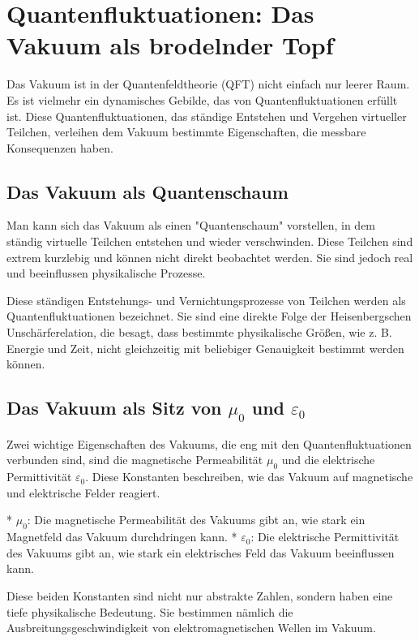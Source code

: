 \documentclass{article}
\begin{document}
\section{Quantenfluktuationen: Das Vakuum als brodelnder Topf}

Das Vakuum ist in der Quantenfeldtheorie (QFT) nicht einfach nur leerer Raum. Es ist vielmehr ein dynamisches Gebilde, das von Quantenfluktuationen erfüllt ist. Diese Quantenfluktuationen, das ständige Entstehen und Vergehen virtueller Teilchen, verleihen dem Vakuum bestimmte Eigenschaften, die messbare Konsequenzen haben.

\subsection{Das Vakuum als Quantenschaum}

Man kann sich das Vakuum als einen "Quantenschaum" vorstellen, in dem ständig virtuelle Teilchen entstehen und wieder verschwinden. Diese Teilchen sind extrem kurzlebig und können nicht direkt beobachtet werden. Sie sind jedoch real und beeinflussen physikalische Prozesse.

Diese ständigen Entstehungs- und Vernichtungsprozesse von Teilchen werden als Quantenfluktuationen bezeichnet. Sie sind eine direkte Folge der Heisenbergschen Unschärferelation, die besagt, dass bestimmte physikalische Größen, wie z. B. Energie und Zeit, nicht gleichzeitig mit beliebiger Genauigkeit bestimmt werden können.

\subsection{Das Vakuum als Sitz von $\mu_0$ und $\varepsilon_0$}

Zwei wichtige Eigenschaften des Vakuums, die eng mit den Quantenfluktuationen verbunden sind, sind die magnetische Permeabilität $\mu_0$ und die elektrische Permittivität $\varepsilon_0$. Diese Konstanten beschreiben, wie das Vakuum auf magnetische und elektrische Felder reagiert.

*   $\mu_0$: Die magnetische Permeabilität des Vakuums gibt an, wie stark ein Magnetfeld das Vakuum durchdringen kann.
*   $\varepsilon_0$: Die elektrische Permittivität des Vakuums gibt an, wie stark ein elektrisches Feld das Vakuum beeinflussen kann.

Diese beiden Konstanten sind nicht nur abstrakte Zahlen, sondern haben eine tiefe physikalische Bedeutung. Sie bestimmen nämlich die Ausbreitungsgeschwindigkeit von elektromagnetischen Wellen im Vakuum.
\end{document}
